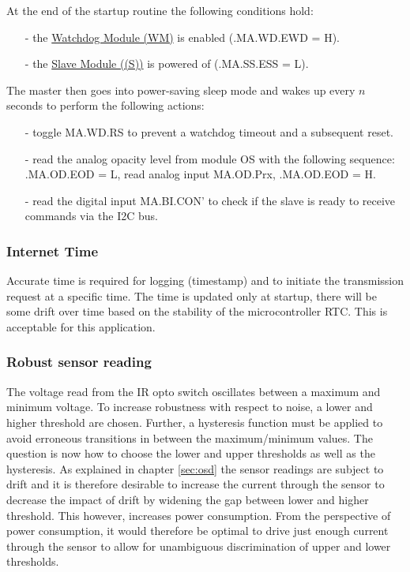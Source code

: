 At the end of the startup routine the following conditions hold:
\begin{itemize}
    \item [-] the \hyperref[sec:WD]{Watchdog Module (WM)} is enabled (.MA.WD.EWD = H).
    \item [-] the  \hyperref[sec:SL]{Slave Module ((\mu S))} is powered of (.MA.SS.ESS = L).
\end{itemize}

The master then goes into power-saving sleep mode and wakes up every $n$ seconds to perform the following actions:
\begin{itemize}
    \item [-] toggle MA.WD.\neg RS to prevent a watchdog timeout and a subsequent reset.
    \item [-] read the analog opacity level from module OS with the following sequence: \\
          .MA.OD.EOD = L, read analog input MA.OD.Prx, .MA.OD.EOD = H.
    \item [-] read the digital input MA.BI.CON' to check if the slave is ready to receive commands via the I2C bus.
\end{itemize}





\subsubsection{Internet Time}

Accurate time is required for logging (timestamp) and to initiate the transmission request at a specific time.
The time is updated only at startup, there will be some drift over time based on the stability of the microcontroller RTC.
This is acceptable for this application.

\subsubsection{Robust sensor reading}
\label{sec:rsr}

The voltage read from the IR opto switch oscillates between a maximum and minimum voltage.
To increase robustness with respect to noise, a lower and higher threshold are chosen. Further, a hysteresis function
must be applied to avoid erroneous transitions in between the maximum/minimum values.
The question is now how to choose the lower and upper thresholds as well as the hysteresis.
As explained in chapter \ref{sec:osd} the sensor readings are subject to drift and it is therefore desirable to
increase the current through the sensor to decrease the impact of drift by widening the gap between lower and
higher threshold. This however, increases power consumption. From the perspective of power consumption,
it would therefore be optimal to drive just enough current through the sensor to allow for unambiguous discrimination
of upper and lower thresholds.


